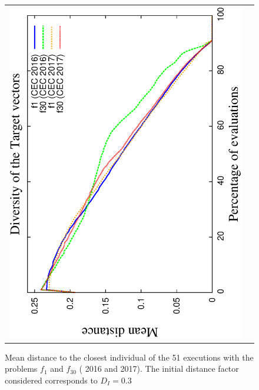 \begin{figure}[t]
\begin{tabular}{cc}
   \includegraphics[scale=0.23, angle=-90]{img/Diversity_Target.eps} 
\end{tabular}
\caption{Mean distance to the closest individual of the 51 executions with the problems $f_1$ and $f_{30}$ (\CEC{} 2016 and \CEC{} 2017). The initial distance factor considered corresponds to $D_I=0.3$}
\label{fig:diversity}
\end{figure}






